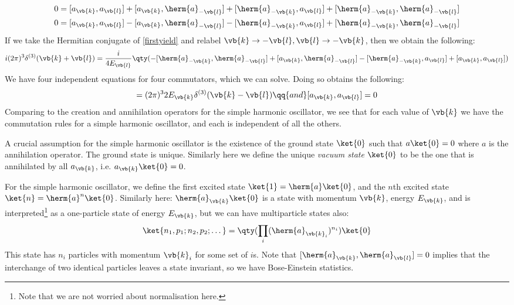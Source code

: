 \documentclass{jknotes} %
\begin{document}
\begin{align}
    0 &= [a_{\vb{k}},a_{\vb{l}}] + [a_{\vb{k}},\herm{a}_{-\vb{l}}]
    +[\herm{a}_{-\vb{k}},a_{\vb{l}}] + [\herm{a}_{-\vb{k}},\herm{a}_{-\vb{l}}] \\
    0 &= [a_{\vb{k}},a_{\vb{l}}] - [a_{\vb{k}},\herm{a}_{-\vb{l}}]
    -[\herm{a}_{-\vb{k}},a_{\vb{l}}] + [\herm{a}_{-\vb{k}},\herm{a}_{-\vb{l}}]
\end{align}
If we take the Hermitian conjugate of \eqref{firstyield} and relabel \(\vb{k}\rightarrow-\vb{l}, \vb{l}\rightarrow-\vb{k}\), then we obtain the following:
\begin{equation}
    i(2\pi)^3\delta^{(3)}(\vb{k}+\vb{l}) = \frac{i}{4E_{\vb{l}}}\qty(
    -[\herm{a}_{-\vb{k}},\herm{a}_{-\vb{l}}] 
    +[a_{\vb{k}},\herm{a}_{-\vb{l}}]
    -[\herm{a}_{-\vb{k}},a_{\vb{l}}]
    +[a_{\vb{k}},a_{\vb{l}}]
    )
\end{equation}
We have four independent equations for four commutators, which we can solve. Doing so obtains the following:
\begin{equation}
    [a_{\vb{k}},\herm{a}_{\vb{l}}] = (2\pi)^32E_{\vb{k}}\delta^{(3)}(\vb{k}-\vb{l}) \qq{and} [a_{\vb{k}},a_{\vb{l}}] = 0
\end{equation}
Comparing to the creation and annihilation operators for the simple harmonic oscillator, we see that for each value of \(\vb{k}\) we have the commutation rules for a simple harmonic oscillator, and each is independent of all the others. 

A crucial assumption for the simple harmonic oscillator is the existence of the ground state \(\ket{0}\) such that \(a\ket{0} = 0\) where \(a\) is the annihilation operator. The ground state is unique. Similarly here we define the unique \emph{vacuum state} \(\ket{0}\) to be the one that is annihilated by all \(a_{\vb{k}}\), i.e. \(a_{\vb{k}}\ket{0}=0\).

For the simple harmonic oscillator, we define the first excited state \(\ket{1}=\herm{a}\ket{0}\), and the \(n\)th excited state \(\ket{n}=\herm{a}^n\ket{0}\). Similarly here: \(\herm{a}_{\vb{k}}\ket{0}\) is a state with momentum \(\vb{k}\), energy \(E_{\vb{k}}\), and is interpreted\footnote{Note that we are not worried about normalisation here.} as a one-particle state of energy \(E_{\vb{k}}\), but we can have multiparticle states also:
\begin{equation}
    \ket{n_1,p_1;n_2,p_2;\dots} = \qty(\prod_i(\herm{a}_{\vb{k}_i})^{n_i})\ket{0}
\end{equation}
This state has \(n_i\) particles with momentum \(\vb{k}_i\) for some set of \(i\)s.
Note that \([\herm{a}_{\vb{k}},\herm{a}_{\vb{l}}] = 0\) implies that the interchange of two identical particles leaves a state invariant, so we have Bose-Einstein statistics.
\end{document}
